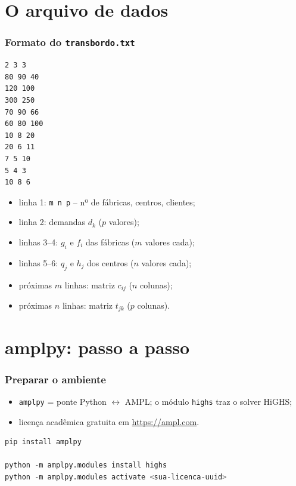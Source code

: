 \documentclass[fleqn]{beamer}
\begin{document}
\section{O arquivo de dados}

\begin{frame}[fragile]
	\frametitle{Formato do \texttt{transbordo.txt}}
	\begin{lstlisting}
2 3 3
80 90 40
120 100
300 250
70 90 66
60 80 100
10 8 20
20 6 11
7 5 10
5 4 3
10 8 6
	\end{lstlisting}
	\begin{itemize}
		\item linha 1: \texttt{m n p} -- nº de fábricas, centros, clientes;
		\item linha 2: demandas $d_k$ ($p$ valores);
		\item linhas 3--4: $g_i$ e $f_i$ das fábricas ($m$ valores cada);
		\item linhas 5--6: $q_j$ e $h_j$ dos centros ($n$ valores cada);
		\item próximas $m$ linhas: matriz $c_{ij}$ ($n$ colunas);
		\item próximas $n$ linhas: matriz $t_{jk}$ ($p$ colunas).
	\end{itemize}
\end{frame}

\section{amplpy: passo a passo}

\begin{frame}[fragile]
	\frametitle{Preparar o ambiente}
	\begin{itemize}
		\item \texttt{amplpy} = ponte Python $\leftrightarrow$ AMPL; o
			módulo \texttt{highs} traz o solver HiGHS;
		\item licença acadêmica gratuita em \url{https://ampl.com}.
	\end{itemize}
	\begin{lstlisting}[language=Python,basicstyle=\ttfamily\small]
pip install amplpy

python -m amplpy.modules install highs
python -m amplpy.modules activate <sua-licenca-uuid>
	\end{lstlisting}
\end{frame}
\end{document}
